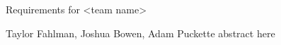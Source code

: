 \documentclass[titlepage]{article}
\begin{document}
\begin{titlepage}
\centering
{\Huge Requirements for <team name>\par}
{\Large Taylor Fahlman, Joshua Bowen, Adam Puckette}
\abstract
abstract here
\end{titlepage}
\end{document}
